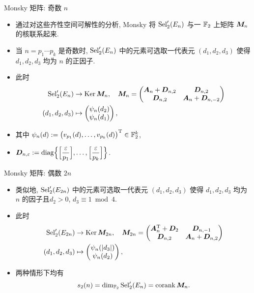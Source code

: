 \documentclass[aspectratio=169]{ctexbeamer}
\renewcommand\aleg[2]{\Bigl[\dfrac{{#1}}{#2}\Bigr]}
\begin{document}
\begin{frame}{Monsky 矩阵: 奇数 $n$}
	\begin{itemize}
		\item 通过对这些齐性空间可解性的分析, Monsky 将 ${\mathrm{Sel}}_2'(E_n)$ 与一 ${\mathbb{F}}_2$ 上矩阵 ${\boldsymbol{M}}_n$ 的核联系起来.
		\item 当 $n=p_1\cdots p_k$ 是奇数时, ${\mathrm{Sel}}_2'(E_n)$ 中的元素可选取一代表元 $(d_1,d_2,d_3)$ 使得 $d_1,d_2, d_3$ 均为 $n$ 的正因子.
		\item 此时
		\[
			\begin{aligned}
				{\mathrm{Sel}}_2'(E_n)&\rightarrow\operatorname{Ker}{\boldsymbol{M}}_n,\quad {\boldsymbol{M}}_n=\begin{pmatrix}
					{\boldsymbol{A}}_n+{\boldsymbol{D}}_{n,2}&{\boldsymbol{D}}_{n,2}\\
					{\boldsymbol{D}}_{n,2}&{\boldsymbol{A}}_n+{\boldsymbol{D}}_{n,-2}
				\end{pmatrix}\\
				(d_1,d_2,d_3)&\mapsto\begin{pmatrix}
					\psi_n(d_2)\\ \psi_n(d_1)
				\end{pmatrix},
			\end{aligned}
		\]
		\item 其中 $\psi_n(d):=\bigl(v_{p_1}(d),\dots,v_{p_k}(d)\bigr)^{\mathrm{T}}\in{\mathbb{F}}_2^k$,
		\item $\bfD_{n,\varepsilon}:=\diag\Bigl\{\aleg{\varepsilon}{p_1},\dots,\aleg{\varepsilon}{p_k}\Bigr\}$.
	\end{itemize}
\end{frame}


\begin{frame}{Monsky 矩阵: 偶数 $2n$}
	\begin{itemize}
		\item 类似地, ${\mathrm{Sel}}_2'(E_{2n})$ 中的元素可选取一代表元 $(d_1,d_2,d_3)$ 使得 $d_1,d_2, d_3$ 均为 $n$ 的因子且$d_2>0$, $d_3\equiv1\bmod4$.
		\item 此时
		\[
			\begin{aligned}
				{\mathrm{Sel}}_2'(E_{2n})&\rightarrow\operatorname{Ker}{\boldsymbol{M}}_{2n},\quad {\boldsymbol{M}}_{2n}=\begin{pmatrix}
					{\boldsymbol{A}}_n^{\mathrm{T}}+{\boldsymbol{D}}_2&{\boldsymbol{D}}_{n,-1}\\
					{\boldsymbol{D}}_{n,2}&{\boldsymbol{A}}_n+{\boldsymbol{D}}_{n,2}
				\end{pmatrix}\\
				(d_1,d_2,d_3)&\mapsto\begin{pmatrix}
					\psi_n(|d_3|)\\ \psi_n(d_2)
				\end{pmatrix},
			\end{aligned}
		\]
		\item 两种情形下均有
		\[
			s_2(n)=\dim_{{\mathbb{F}}_2}{\mathrm{Sel}}_2'(E_n)=\operatorname{corank} {\boldsymbol{M}}_n.
		\]
	\end{itemize}
\end{frame}
\end{document}
